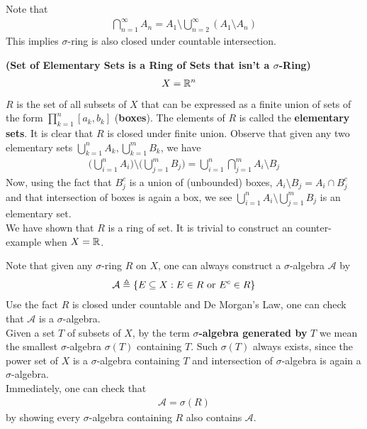 \documentclass{report}
\begin{document}
\begin{mdframed}
Note that 
\begin{align*}
\bigcap_{n=1}^{\infty} A_n= A_1 \setminus \bigcup_{n=2}^{\infty} (A_1 \setminus A_n)
\end{align*}
This implies $\sigma$-ring is also closed under countable intersection. 
\end{mdframed}
\begin{Example}{\textbf{(Set of Elementary Sets is a  Ring of Sets that isn't a  $\sigma$-Ring)}}{}
\begin{align*}
&X=\mathbb{R}^n
\end{align*}
$R$ is the set of all subsets of $X$ that can be expressed as a finite union of sets of the form $\prod_{k=1}^n [a_k,b_k]$ (\textbf{boxes}). The elements of $R$ is called the  \textbf{elementary sets}. It is clear that $R$ is closed under finite union. Observe that given any two elementary sets $\bigcup_{k=1}^n A_k,\bigcup_{k=1}^m B_k$, we have 
\begin{align*}
\Big(\bigcup_{i=1}^n A_i \Big)\setminus \Big(\bigcup_{j=1}^m B_j \Big)=\bigcup_{i=1}^n \bigcap_{j=1}^m A_i \setminus  B_j
\end{align*}
Now, using the fact that $B_j^c$ is a union of (unbounded) boxes, $A_i \setminus  B_j= A_i \cap B_j^c$ and that intersection of boxes is again a box, we see $\bigcup_{i=1}^n A_i \setminus \bigcup_{j=1}^m B_j$ is an elementary set.\\

We have shown that $R$ is a ring of set. It is trivial to construct an counter-example when $X=\mathbb{R}$. 
\end{Example}
\begin{mdframed}
Note that given any $\sigma$-ring $R$ on $X$, one can always construct a  $\sigma$-algebra $\mathcal{A}$ by 
\begin{align*}
\mathcal{A}\triangleq \{ E \subseteq X: E\in R\text{ or }E^c \in R \}
\end{align*}
Use the fact $R$ is closed under countable and De Morgan's Law, one can check that $\mathcal{A}$ is a $\sigma$-algebra.\\

Given a set $T$ of subsets of $X$, by the term \textbf{$\sigma$-algebra generated by} $T$ we mean the smallest $\sigma$-algebra $\sigma(T)$ containing $T$. Such  $\sigma(T)$ always exists, since the power set of  $X$ is a  $\sigma$-algebra containing $T$ and intersection of $\sigma$-algebra is again a $\sigma$-algebra.\\

Immediately, one can check that 
\begin{align*}
\mathcal{A}=\sigma (R)
\end{align*}
by showing every $\sigma$-algebra containing $R$ also contains  $\mathcal{A}$.
\end{mdframed}
\end{document}
